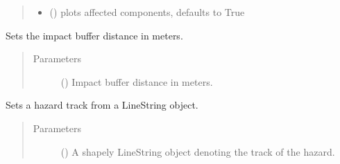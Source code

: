 \documentclass[letterpaper,10pt,english]{sphinxmanual}
\begin{document}
\begin{fulllineitems}
\begin{fulllineitems}
\begin{quote}
\begin{description}
\begin{itemize}
\item {} 
\sphinxAtStartPar
{} (\sphinxstyleliteralemphasis{\sphinxupquote{, }}) \textendash{} plots affected components, defaults to True

\end{itemize}

\end{description}\end{quote}

\end{fulllineitems}


\begin{fulllineitems}
\label{\detokenize{apidoc:dreaminsg_integrated_model.src.hazard_initiator.TrackDisruption.set_buffer_of_impact}}
\sphinxAtStartPar
Sets the impact buffer distance in meters.
\begin{quote}\begin{description}
\item[{Parameters}] \leavevmode
\sphinxAtStartPar
{} () \textendash{} Impact buffer distance in meters.

\end{description}\end{quote}

\end{fulllineitems}


\begin{fulllineitems}
\label{\detokenize{apidoc:dreaminsg_integrated_model.src.hazard_initiator.TrackDisruption.set_hazard_tracks_from_linestring}}
\sphinxAtStartPar
Sets a hazard track from a LineString object.
\begin{quote}\begin{description}
\item[{Parameters}] \leavevmode
\sphinxAtStartPar
{} () \textendash{} A shapely LineString object denoting the track of the hazard.


\end{description}
\end{quote}
\end{fulllineitems}
\end{fulllineitems}
\end{document}

